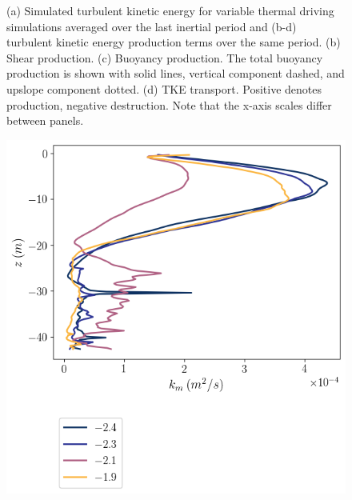 \documentclass[draft,jgrga]{agutexSI2019}
\begin{document}
\begin{figure}
\begin{minipage}{0.5\textwidth}
    \end{minipage}
    \caption{(a) Simulated turbulent kinetic energy for variable thermal driving simulations averaged over the last inertial period and (b-d) turbulent kinetic energy production terms over the same period. (b) Shear production. (c) Buoyancy production. The total buoyancy production is shown with solid lines, vertical component dashed, and upslope component dotted. (d) TKE transport. Positive denotes production, negative destruction. Note that the x-axis scales differ between panels.}
    \label{fig:tke_budget}
\end{figure}

\begin{figure}[]
    \centering
    \begin{minipage}{0.5\textwidth}
        \includegraphics[trim={0 4.5cm 0 0},clip, width=\textwidth]{Figures/km_cmp_dT_44h_tav12_z_profile.png}
    \end{minipage}%
    \begin{minipage}{0.5\textwidth}

\end{minipage}
\end{figure}
\end{document}
